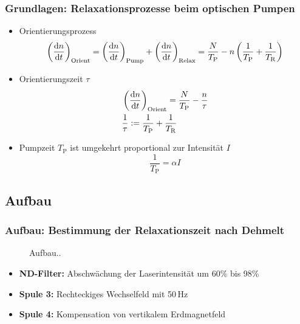 \begin{frame}
\frametitle{Grundlagen: Relaxationsprozesse beim optischen Pumpen}
\begin{itemize}[<+->]
    \item Orientierungsprozess
    \begin{equation*}
        \left(\frac{\mathrm{d} n}{\mathrm{d} t}\right)_{\text{Orient}}
        =\left(\frac{\mathrm{d} n}{\mathrm{d} t}\right)_{\text{Pump}} + \left(\frac{\mathrm{d} n}{\mathrm{d} t}\right)_{\text{Relax}}
        =\frac{N}{T_\text{P}}-n \left( \frac{1}{T_\text{P}} + \frac{1}{T_\text{R}}\right)
    \end{equation*}
    \item Orientierungszeit $\tau$
    \begin{equation*}
        \begin{split}
            & \left(\frac{\mathrm{d} n}{\mathrm{d} t}\right)_{\text{Orient}} = \frac{N}{T_\text{P}}- \frac{n}{\tau} \\
            & \frac{1}{\tau} := \frac{1}{T_\text{P}} + \frac{1}{T_\text{R}}
        \end{split}
    \end{equation*}
    \item Pumpzeit $T_\text{P}$ ist umgekehrt proportional zur Intensität $I$
    \begin{equation*}
        \frac{1}{T_\text{P}} = \alpha I
    \end{equation*}
\end{itemize}
\end{frame}



\subsection{Aufbau}
\begin{frame}
\frametitle{Aufbau: Bestimmung der Relaxationszeit nach Dehmelt}

\begin{figure}
    \centering
    \def\svgwidth{\textwidth}
    
    \caption{Aufbau..}
\end{figure}

\begin{itemize}
    \item \textbf{ND-Filter:} Abschwächung der Laserintensität um 60\% bis 98\%
    \item \textbf{Spule 3:} Rechteckiges Wechselfeld mit 50\,Hz
    \item \textbf{Spule 4:} Kompensation von vertikalem Erdmagnetfeld
\end{itemize}
\end{frame}

